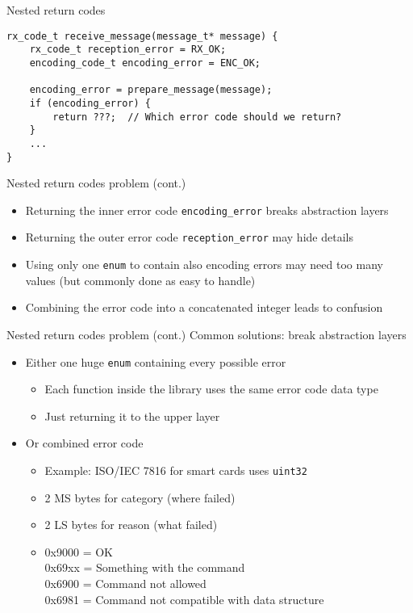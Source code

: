 \documentclass[aspectratio=169,14pt]{beamer}
\begin{document}
\begin{frame}[fragile]{Nested return codes }
\begin{lstlisting}[style=cstyle]
rx_code_t receive_message(message_t* message) {
    rx_code_t reception_error = RX_OK;
    encoding_code_t encoding_error = ENC_OK;
    
    encoding_error = prepare_message(message);
    if (encoding_error) {
        return ???;  // Which error code should we return?
    }
    ...
}
\end{lstlisting}
\end{frame}



\begin{frame}{Nested return codes problem (cont.)}
\begin{itemize}
    \item Returning the inner error code \texttt{encoding\_error} breaks abstraction layers
    \item Returning the outer error code \texttt{reception\_error} may hide details
    \item Using only one \texttt{enum} to contain also encoding errors may need too many values (but commonly done as easy to handle)
    \item Combining the error code into a concatenated integer leads to confusion
\end{itemize}
\end{frame}



\begin{frame}{Nested return codes problem (cont.)}
Common solutions: break abstraction layers

\begin{itemize}
    \item Either one huge \texttt{enum} containing every possible error\\
    \begin{itemize}
        \item Each function inside the library uses the same error code data type
        \item Just returning it to the upper layer
    \end{itemize}
    \item Or combined error code\\
    \begin{itemize}
        \item Example: ISO/IEC 7816 for smart cards uses \texttt{uint32}
        \item 2 MS bytes for category (where failed)
        \item 2 LS bytes for reason (what failed)
        \item 0x9000 = OK\\
        0x69xx = Something with the command\\
        0x6900 = Command not allowed\\
        0x6981 = Command not compatible with data structure
    \end{itemize}
\end{itemize}
\end{frame}
\end{document}
